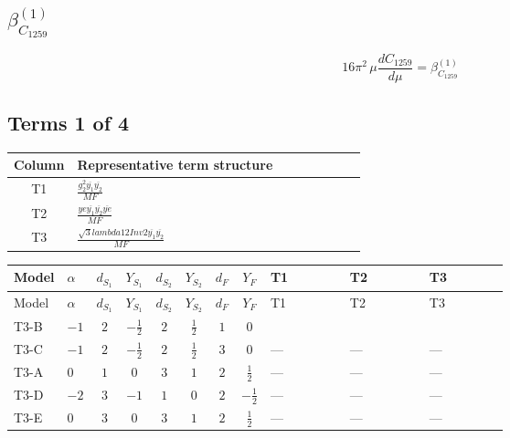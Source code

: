 \documentclass[8pt]{article}
\begin{document}
\begin{landscape}
\section*{$\beta_{C_{1259}}^{(1)}$}
\[16\pi^2\,\mu\frac{d C_{1259}}{d\mu}=\beta_{C_{1259}}^{(1)}\]
\subsection*{Terms 1 of 4}
\begin{center}
\begin{tabular}{@{}c >{\raggedright\arraybackslash}p{0.82\linewidth}@{}}
\toprule
Column & Representative term structure \\
\midrule
T1 & \(\displaystyle \frac{g_{2}^{2} \overline{y_{1}} \overline{y_{2}}}{MF}\) \\
\midrule
T2 & \(\displaystyle \frac{ye \overline{y_{1}} \overline{y_{2}} \overline{ye}}{MF}\) \\
\midrule
T3 & \(\displaystyle \frac{\sqrt{3} lambda12Inv2 \overline{y_{1}} \overline{y_{2}}}{MF}\) \\
\midrule
\bottomrule
\end{tabular}
\end{center}
\smallskip
\tiny
\begin{longtable}{@{}llcccccc >{\raggedright\arraybackslash}p{0.21\linewidth} >{\raggedright\arraybackslash}p{0.21\linewidth} >{\raggedright\arraybackslash}p{0.21\linewidth}@{}}
\toprule
Model & $\alpha$ & $d_{S_1}$ & $Y_{S_1}$ & $d_{S_2}$ & $Y_{S_2}$ & $d_F$ & $Y_F$ & T1 & T2 & T3 \\
\midrule
\endfirsthead
\toprule
Model & $\alpha$ & $d_{S_1}$ & $Y_{S_1}$ & $d_{S_2}$ & $Y_{S_2}$ & $d_F$ & $Y_F$ & T1 & T2 & T3 \\
\midrule
\endhead
T3-B & $-1$ & $2$ & $-\frac{1}{2}$ & $2$ & $\frac{1}{2}$ & $1$ & $0$ & \scriptsize\adjustbox{max width=\linewidth}{$\begin{gathered} \frac{3 g_{2}^{2} \overline{y_{1}} \overline{y_{2}}}{8 MF}\end{gathered}$} & \scriptsize\adjustbox{max width=\linewidth}{$\begin{gathered} - \frac{ye \overline{y_{1}} \overline{y_{2}} \overline{ye}}{8 MF}\end{gathered}$} & \scriptsize\adjustbox{max width=\linewidth}{$\begin{gathered} \frac{\sqrt{3} lambda12Inv2 \overline{y_{1}} \overline{y_{2}}}{6 MF}\end{gathered}$} \\
\midrule
T3-C & $-1$ & $2$ & $-\frac{1}{2}$ & $2$ & $\frac{1}{2}$ & $3$ & $0$ & --- & --- & --- \\
\midrule
T3-A & $0$ & $1$ & $0$ & $3$ & $1$ & $2$ & $\frac{1}{2}$ & --- & --- & --- \\
\midrule
T3-D & $-2$ & $3$ & $-1$ & $1$ & $0$ & $2$ & $-\frac{1}{2}$ & --- & --- & --- \\
\midrule
T3-E & $0$ & $3$ & $0$ & $3$ & $1$ & $2$ & $\frac{1}{2}$ & --- & --- & --- \\
\midrule
\bottomrule
\end{longtable}
\clearpage

\end{landscape}
\end{document}
